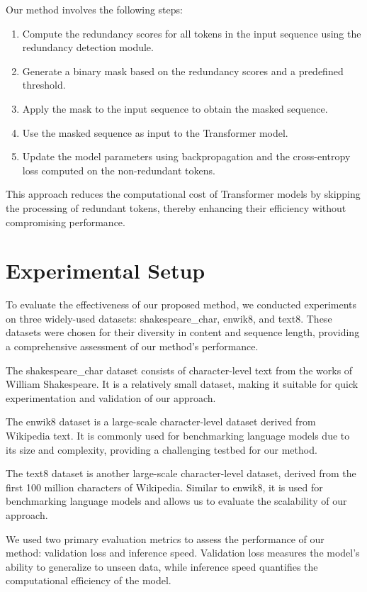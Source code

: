 \documentclass{article} %
\begin{document}
Our method involves the following steps:
\begin{enumerate}
    \item Compute the redundancy scores for all tokens in the input sequence using the redundancy detection module.
    \item Generate a binary mask based on the redundancy scores and a predefined threshold.
    \item Apply the mask to the input sequence to obtain the masked sequence.
    \item Use the masked sequence as input to the Transformer model.
    \item Update the model parameters using backpropagation and the cross-entropy loss computed on the non-redundant tokens.
\end{enumerate}
This approach reduces the computational cost of Transformer models by skipping the processing of redundant tokens, thereby enhancing their efficiency without compromising performance.

\section{Experimental Setup}
\label{sec:experimental}

To evaluate the effectiveness of our proposed method, we conducted experiments on three widely-used datasets: shakespeare\_char, enwik8, and text8. These datasets were chosen for their diversity in content and sequence length, providing a comprehensive assessment of our method's performance.

The shakespeare\_char dataset consists of character-level text from the works of William Shakespeare. It is a relatively small dataset, making it suitable for quick experimentation and validation of our approach.

The enwik8 dataset is a large-scale character-level dataset derived from Wikipedia text. It is commonly used for benchmarking language models due to its size and complexity, providing a challenging testbed for our method.

The text8 dataset is another large-scale character-level dataset, derived from the first 100 million characters of Wikipedia. Similar to enwik8, it is used for benchmarking language models and allows us to evaluate the scalability of our approach.

We used two primary evaluation metrics to assess the performance of our method: validation loss and inference speed. Validation loss measures the model's ability to generalize to unseen data, while inference speed quantifies the computational efficiency of the model.
\end{document}
